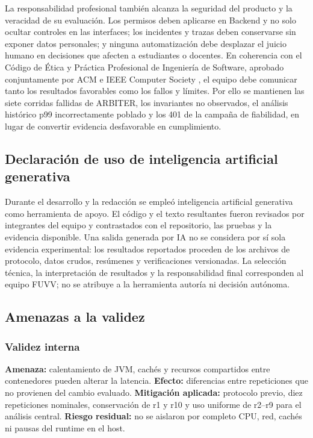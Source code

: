 La responsabilidad profesional también alcanza la seguridad del producto y la
veracidad de su evaluación. Los permisos deben aplicarse en Backend y no solo
ocultar controles en las interfaces; los incidentes y trazas deben conservarse
sin exponer datos personales; y ninguna automatización debe desplazar el juicio
humano en decisiones que afecten a estudiantes o docentes. En coherencia con el
Código de Ética y Práctica Profesional de Ingeniería de Software, aprobado
conjuntamente por ACM e IEEE Computer Society \cite{acmieee1999secode}, el equipo
debe comunicar tanto los resultados favorables como los fallos y límites. Por
ello se mantienen las siete corridas fallidas de ARBITER, los invariantes no
observados, el análisis histórico p99 incorrectamente poblado y los 401 de la
campaña de fiabilidad, en
lugar de convertir evidencia desfavorable en cumplimiento.

\subsection{Declaración de uso de inteligencia artificial generativa}
\label{subsec:declaracion-ia}

Durante el desarrollo y la redacción se empleó inteligencia artificial
generativa como herramienta de apoyo. El código y el texto resultantes fueron
revisados por integrantes del equipo y contrastados con el repositorio, las
pruebas y la evidencia disponible. Una salida generada por IA no se considera
por sí sola evidencia experimental: los resultados reportados proceden de los
archivos de protocolo, datos crudos, resúmenes y verificaciones versionadas. La
selección técnica, la interpretación de resultados y la responsabilidad final
corresponden al equipo FUVV; no se atribuye a la herramienta autoría ni decisión
autónoma.

\subsection{Amenazas a la validez}
\label{subsec:amenazas-validez}

\subsubsection{Validez interna}

\textbf{Amenaza:} calentamiento de JVM, cachés y recursos compartidos entre
contenedores pueden alterar la latencia. \textbf{Efecto:} diferencias entre
repeticiones que no provienen del cambio evaluado. \textbf{Mitigación aplicada:}
protocolo previo, diez repeticiones nominales, conservación de r1 y r10 y uso
uniforme de r2--r9 para el análisis central. \textbf{Riesgo residual:} no se
aislaron por completo CPU, red, cachés ni pausas del runtime en el host.

